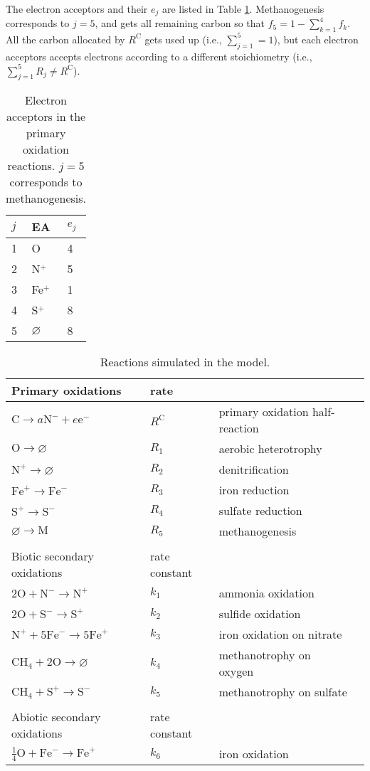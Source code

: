 \documentclass{report}
\newcommand{\m}[1]{ \mathrm{#1} }
\begin{document}
The electron acceptors and their $e_j$ are listed in Table \ref{tab:electron_acceptors}. Methanogenesis
corresponds to $j=5$, and gets all remaining carbon so that $f_5 = 1 - \sum_{k=1}^4 f_k$.
All the carbon allocated by $R^\m{C}$ gets used up (i.e., $\sum_{j=1}^5 = 1$), but each electron
acceptors accepts electrons according to a different stoichiometry (i.e., $\sum_{j=1}^5 R_j \ne
R^\m{C}$).

\begin{table}
\centering
\begin{tabular}{ l l l }
\toprule
$j$ &   EA   &   $e_j$   \\
\midrule
1   &   O   & 4  \\
2   &   N$^+$   & 5  \\
3   &   Fe$^+$  & 1  \\
4   &   S$^+$   & 8  \\
5   &   $\varnothing$   & 8  \\
\bottomrule
\end{tabular}
\caption{Electron acceptors in the primary oxidation reactions. $j=5$ corresponds to
methanogenesis.}
\label{tab:electron_acceptors}
\end{table}

\begin{table}
\begin{tabular}{ l l l l }
\toprule
Primary oxidations  & rate \\
\midrule
$\m{C} \rightarrow a \m{N}^- + e \m{e}^-$   & $R^\m{C}$ & primary oxidation half-reaction \\
$\m{O} \to \varnothing$    &   $R_1$   & aerobic heterotrophy \\
$\m{N}^+ \to \varnothing$    &   $R_2$   & denitrification \\
$\m{Fe}^+ \to \m{Fe}^-$ & $R_3$ & iron reduction  \\
$\m{S}^+ \to \m{S}^-$ & $R_4$ & sulfate reduction  \\
$\varnothing \to \m{M}$ & $R_5$ & methanogenesis \\
\\
\midrule
Biotic secondary oxidations & rate constant \\
\midrule
$2 \m{O} + \m{N}^- \rightarrow \m{N}^+$  & $k_1$ & ammonia oxidation   \\
$2 \m{O} + \m{S}^- \rightarrow \m{S}^+$  & $k_2$ & sulfide oxidation   \\
$\m{N}^+ + 5 \m{Fe}^- \rightarrow 5 \m{Fe}^+$    &   $k_3$  & iron oxidation on nitrate  \\
$\m{CH}_4 + 2 \m{O} \rightarrow \varnothing$    &   $k_4$  & methanotrophy on oxygen  \\
$\m{CH}_4 + \m{S}^+ \rightarrow \m{S}^-$    &   $k_5$  & methanotrophy on sulfate  \\
\\
\midrule
Abiotic secondary oxidations    & rate constant \\
\midrule
$\tfrac{1}{4} \m{O} + \m{Fe}^- \rightarrow \m{Fe}^+$ & $k_6$ & iron oxidation  \\
\bottomrule
\end{tabular}
\label{tab:reactions}
\caption{Reactions simulated in the model.}
\end{table}
\end{document}
